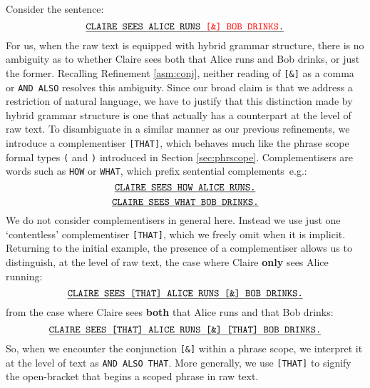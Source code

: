 \begin{refinement}\label{conv:complement}
Consider the sentence:
\[
\texttt{\underline{CLAIRE SEES ALICE RUNS \bR[\&] BOB DRINKS\e.}}
\]
For us, when the raw text is equipped with hybrid grammar structure, there is no ambiguity as to whether Claire sees both that Alice runs and Bob drinks, or just the former. Recalling Refinement \ref{asm:conj}, neither reading of \texttt{[\&]} as a comma or \texttt{AND ALSO} resolves this ambiguity. Since our broad claim is that we address a restriction of natural language, we have to justify that this distinction made by hybrid grammar structure is one that actually has a counterpart at the level of raw text. To disambiguate in a similar manner as our previous refinements, we introduce a complementiser \texttt{[THAT]}, which behaves much like the phrase scope formal types \texttt{(} and \texttt{)} introduced in Section \ref{sec:phrscope}. Complementisers are words such as \texttt{HOW} or \texttt{WHAT}, which prefix sentential complements~e.g.:
\[
\texttt{\underline{CLAIRE SEES HOW ALICE RUNS.}}
\]
\[
\texttt{\underline{CLAIRE SEES WHAT BOB DRINKS.}}
\]
We do not consider complementisers in general here. Instead we use just one `contentless' complementiser \texttt{[THAT]}, which we freely omit when it is implicit. Returning to the initial example, the presence of a complementiser allows us to distinguish, at the level of raw text, the case where Claire \textbf{only} sees Alice running:
\[
\texttt{\underline{CLAIRE SEES [THAT] ALICE RUNS [\&] BOB DRINKS.}}
\]
from the case where Claire sees \textbf{both} that Alice runs and that Bob drinks:
\[
\texttt{\underline{CLAIRE SEES [THAT] ALICE RUNS [\&] [THAT] BOB DRINKS.}}
\]
So, when we encounter the conjunction \texttt{[\&]} within a phrase scope, we interpret it at the level of text as \texttt{AND ALSO THAT}. More generally, we use \texttt{[THAT]} to signify the open-bracket that begins a scoped phrase in raw text.
\end{refinement}

%


